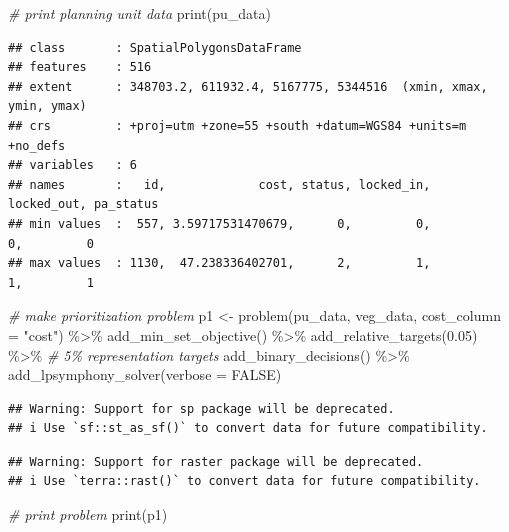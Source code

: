 \documentclass[
  12pt,
]{book}
\newenvironment{Shaded}{\begin{snugshade}}{\end{snugshade}}
\newcommand{\AttributeTok}[1]{\textcolor[rgb]{0.77,0.63,0.00}{#1}}
\newcommand{\CommentTok}[1]{\textcolor[rgb]{0.56,0.35,0.01}{\textit{#1}}}
\newcommand{\ConstantTok}[1]{\textcolor[rgb]{0.00,0.00,0.00}{#1}}
\newcommand{\FloatTok}[1]{\textcolor[rgb]{0.00,0.00,0.81}{#1}}
\newcommand{\FunctionTok}[1]{\textcolor[rgb]{0.00,0.00,0.00}{#1}}
\newcommand{\NormalTok}[1]{#1}
\newcommand{\OtherTok}[1]{\textcolor[rgb]{0.56,0.35,0.01}{#1}}
\newcommand{\SpecialCharTok}[1]{\textcolor[rgb]{0.00,0.00,0.00}{#1}}
\newcommand{\StringTok}[1]{\textcolor[rgb]{0.31,0.60,0.02}{#1}}
\begin{document}
\begin{Shaded}
\begin{Highlighting}[]
\CommentTok{\# print planning unit data}
\FunctionTok{print}\NormalTok{(pu\_data)}
\end{Highlighting}
\end{Shaded}

\begin{verbatim}
## class       : SpatialPolygonsDataFrame 
## features    : 516 
## extent      : 348703.2, 611932.4, 5167775, 5344516  (xmin, xmax, ymin, ymax)
## crs         : +proj=utm +zone=55 +south +datum=WGS84 +units=m +no_defs 
## variables   : 6
## names       :   id,             cost, status, locked_in, locked_out, pa_status 
## min values  :  557, 3.59717531470679,      0,         0,          0,         0 
## max values  : 1130,  47.238336402701,      2,         1,          1,         1
\end{verbatim}

\begin{Shaded}
\begin{Highlighting}[]
\CommentTok{\# make prioritization problem}
\NormalTok{p1 }\OtherTok{\textless{}{-}} \FunctionTok{problem}\NormalTok{(pu\_data, veg\_data, }\AttributeTok{cost\_column =} \StringTok{"cost"}\NormalTok{) }\SpecialCharTok{\%\textgreater{}\%}
      \FunctionTok{add\_min\_set\_objective}\NormalTok{() }\SpecialCharTok{\%\textgreater{}\%}
      \FunctionTok{add\_relative\_targets}\NormalTok{(}\FloatTok{0.05}\NormalTok{) }\SpecialCharTok{\%\textgreater{}\%} \CommentTok{\# 5\% representation targets}
      \FunctionTok{add\_binary\_decisions}\NormalTok{() }\SpecialCharTok{\%\textgreater{}\%}
      \FunctionTok{add\_lpsymphony\_solver}\NormalTok{(}\AttributeTok{verbose =} \ConstantTok{FALSE}\NormalTok{)}
\end{Highlighting}
\end{Shaded}

\begin{verbatim}
## Warning: Support for sp package will be deprecated.
## i Use `sf::st_as_sf()` to convert data for future compatibility.
\end{verbatim}

\begin{verbatim}
## Warning: Support for raster package will be deprecated.
## i Use `terra::rast()` to convert data for future compatibility.
\end{verbatim}

\begin{Shaded}
\begin{Highlighting}[]
\CommentTok{\# print problem}
\FunctionTok{print}\NormalTok{(p1)}
\end{Highlighting}
\end{Shaded}
\end{document}
